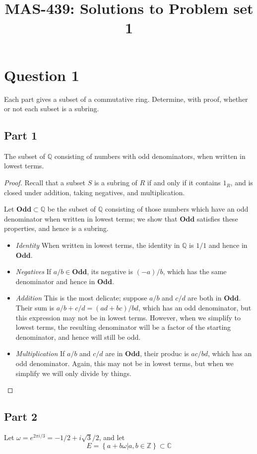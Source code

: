 \documentclass{amsart}[12pt]
\title{MAS-439: Solutions to Problem set 1}
\newcommand{\Q}{\mathbb{Q}}
\newcommand{\Z}{\mathbb{Z}}
\newcommand{\C}{\mathbb{C}}
\begin{document}
\maketitle

\section*{Question 1}

Each part gives a subset of a commutative ring.  Determine, with proof, whether or not each subset is a subring.

\subsection*{Part 1} The subset of $\Q$ consisting of numbers with odd denominators, when written in lowest terms.

\begin{proof}
Recall that a subset $S$ is a subring of $R$ if and only if it contains $1_R$, and is closed under addition, taking negatives, and multiplication.

Let $\mathbf{Odd}\subset\Q$ be the subset of $\Q$ consisting of those numbers which have an odd denominator when written in lowest terms; we show that $\mathbf{Odd}$ satisfies these properties, and hence is a subring.


\begin{itemize}
\item \emph{Identity} When written in lowest terms, the identity in $\Q$ is $1/1$ and hence in $\mathbf{Odd}$.  
\item \emph{Negatives} If $a/b\in\mathbf{Odd}$, its negative is $(-a)/b$, which has the same denominator and hence in $\mathbf{Odd}$.
\item \emph{Addition} This is the most delicate; suppose $a/b$ and $c/d$ are both in $\mathbf{Odd}$.  Their sum is $a/b+c/d=(ad+bc)/bd$, which has an odd denominator,  but this expression may not be in lowest terms.  However, when we simplify to lowest terms, the resulting denominator will be a factor of the starting denominator, and hence will still be odd.
\item \emph{Multiplication} If $a/b$ and $c/d$ are in $\mathbf{Odd}$, their produc is $ac/bd$, which has an odd denominator.  Again, this may not be in lowest terms, but when we simplify we will only divide by things.
\end{itemize}
\end{proof}

\subsection*{Part 2} Let $\omega=e^{2\pi i/3}=-1/2+i\sqrt{3}/2$, and let 
$$E=\left\{a+b\omega | a,b\in \Z\right\}\subset\C$$
\end{document}
